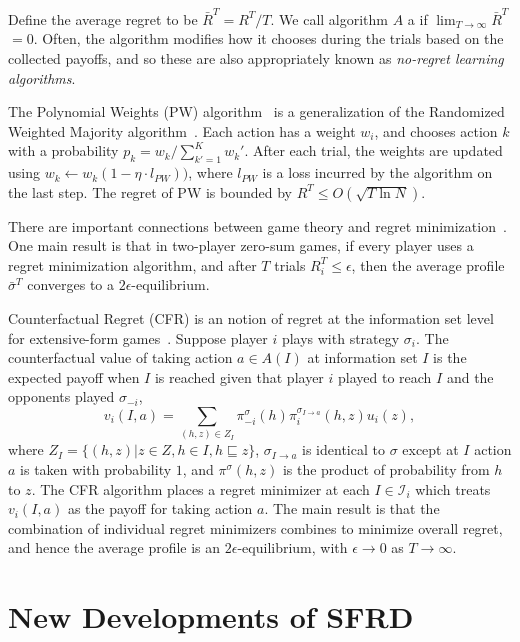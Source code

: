 \documentclass{aamas2014}
\newcommand{\cI}{\mathcal{I}}
\newcommand{\defword}[1]{\textbf{\boldmath{#1}}}
\begin{document}
Define the average regret to be $\bar{R}^T = R^T / T$. We call algorithm $A$ a 
\defword{regret minimization algorithm} if $\lim_{T \rightarrow \infty} \bar{R}^T$ $= 0$. 
Often, the algorithm modifies how it chooses during the trials based on the collected payoffs, and so 
these are also appropriately known as {\it no-regret learning algorithms}. 

The Polynomial Weights (PW) algorithm~\cite{Blum07} is a generalization of the Randomized Weighted Majority 
algorithm~\cite{Littlestone94WM}. Each action has a weight $w_i$, and chooses action $k$ with a probability
$p_k = w_k / \sum_{k'=1}^K w_k'$. After each trial, the weights are updated using $w_k \leftarrow w_k (1 - \eta \cdot l_{PW}))$, 
where $l_{PW}$ is a loss incurred by the algorithm on the last step.
The regret of PW is bounded by $R^T \le O(\sqrt{T \ln N})$. 

There are important connections between game theory and regret minimization~\cite{Blum07}. One main result 
is that in two-player zero-sum games, if every player uses a regret minimization algorithm, and after 
$T$ trials $R_i^T \le \epsilon$, then the average profile $\bar{\sigma}^T$ converges to a $2\epsilon$-equilibrium.

Counterfactual Regret (CFR) is an notion of regret at the information set level for extensive-form games~\cite{CFR}. 
Suppose player $i$ plays with strategy $\sigma_i$. The counterfactual value of taking action $a \in A(I)$ at information 
set $I$ is the expected payoff when $I$ is reached given that player $i$ played to reach $I$ and the opponents played 
$\sigma_{-i}$, 
\begin{equation}
\label{eq:cfv}
v_i(I,a) = \sum_{(h,z) \in Z_I} \pi^{\sigma}_{-i}(h) \pi^{\sigma_{I \rightarrow a}}_{i}(h, z) u_i(z),
\end{equation}
where $Z_I = \{ (h,z) | z \in Z, h \in I, h \sqsubseteq z\}$, $\sigma_{I \rightarrow a}$ is identical to $\sigma$ except 
at $I$ action $a$ is taken with probability $1$, and $\pi^\sigma(h,z)$ is the product of probability from $h$ to $z$. 
The CFR algorithm places a regret minimizer at each $I \in \cI_i$ which treats $v_i(I,a)$ as the payoff for taking action $a$. 
The main result is that the combination of individual regret minimizers
combines to minimize overall regret, and hence the average profile is an $2\epsilon$-equilibrium, with $\epsilon \rightarrow 0$
as $T \rightarrow \infty$. 

\section{New Developments of SFRD}
\end{document}
